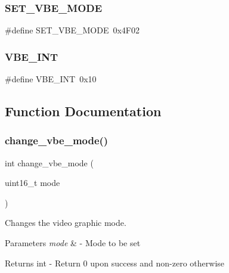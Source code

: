 \subsubsection{\texorpdfstring{S\+E\+T\+\_\+\+V\+B\+E\+\_\+\+M\+O\+DE}{SET\_VBE\_MODE}}
{\footnotesize\ttfamily \#define S\+E\+T\+\_\+\+V\+B\+E\+\_\+\+M\+O\+DE~0x4\+F02}

\mbox{\label{group__vbe_ga0ab1b58dbc6c6d4c63156c11f0a4d854}} 
\subsubsection{\texorpdfstring{V\+B\+E\+\_\+\+I\+NT}{VBE\_INT}}
{\footnotesize\ttfamily \#define V\+B\+E\+\_\+\+I\+NT~0x10}



\subsection{Function Documentation}
\mbox{\label{group__vbe_ga3ed45ade635fef064bfe8c181df1a08f}} 
\subsubsection{\texorpdfstring{change\+\_\+vbe\+\_\+mode()}{change\_vbe\_mode()}}
{\footnotesize\ttfamily int change\+\_\+vbe\+\_\+mode (\begin{DoxyParamCaption}\item[{uint16\+\_\+t}]{mode }\end{DoxyParamCaption})}



Changes the video graphic mode. 


\begin{DoxyParams}{Parameters}
{\em mode} & -\/ Mode to be set \\
\hline
\end{DoxyParams}
\begin{DoxyReturn}{Returns}
int -\/ Return 0 upon success and non-\/zero otherwise 
\end{DoxyReturn}
\mbox{\label{group__vbe_ga384e6657ec15cb7f19a2d15b0337b72a}} 
